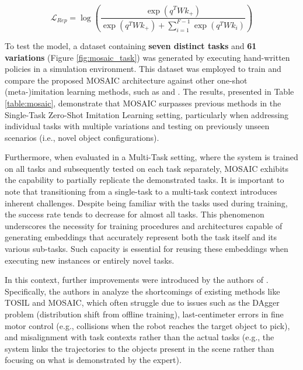 \begin{equation}
    \label{eq:mosaic_contrastive}
    \mathcal{L}_{Rep} = \log\left(\frac{\exp(q^TWk_{+})}{\exp(q^TWk_{+})+ \sum_{i=1}^{F-1}\exp(q^TWk_{i})}\right)
\end{equation}


To test the model, a dataset containing \textbf{seven distinct tasks} and \textbf{61 variations} (Figure \ref{fig:mosaic_task}) was generated by executing hand-written policies in a simulation environment. This dataset was employed to train and compare the proposed MOSAIC architecture against other one-shot (meta-)imitation learning methods, such as \cite{yu2018daml} and \cite{dasari2021transformers_one_shot}. The results, presented in Table \ref{table:mosaic}, demonstrate that MOSAIC surpasses previous methods in the Single-Task Zero-Shot Imitation Learning setting, particularly when addressing individual tasks with multiple variations and testing on previously unseen scenarios (i.e., novel object configurations).

Furthermore, when evaluated in a Multi-Task setting, where the system is trained on all tasks and subsequently tested on each task separately, MOSAIC exhibits the capability to partially replicate the demonstrated tasks. It is important to note that transitioning from a single-task to a multi-task context introduces inherent challenges. Despite being familiar with the tasks used during training, the success rate tends to decrease for almost all tasks. This phenomenon underscores the necessity for training procedures and architectures capable of generating embeddings that accurately represent both the task itself and its various sub-tasks. Such capacity is essential for reusing these embeddings when executing new instances or entirely novel tasks.



In this context, further improvements were introduced by the authors of \cite{chang2023one,cui2023from}. Specifically, the authors in \cite{chang2023one} analyze the shortcomings of existing methods like TOSIL and MOSAIC, which often struggle due to issues such as the DAgger problem (distribution shift from offline training), last-centimeter errors in fine motor control (e.g., collisions when the robot reaches the target object to pick), and misalignment with task contexts rather than the actual tasks (e.g., the system links the trajectories to the objects present in the scene rather than focusing on what is demonstrated by the expert).

